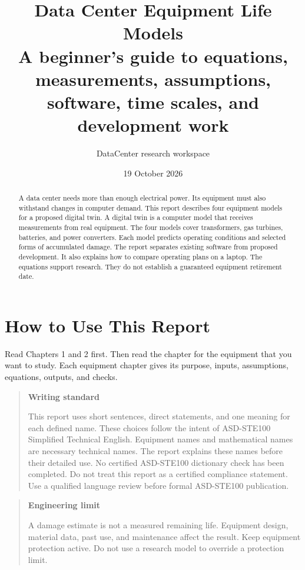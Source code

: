 \documentclass[11pt,a4paper]{report}
\title{Data Center Equipment Life Models\\[6pt]
\large A beginner's guide to equations, measurements, assumptions,\\
software, time scales, and development work}
\author{DataCenter research workspace}
\date{19 October 2026}
\newenvironment{warningbox}[1]{\begin{quote}\color{reportamber}\textbf{#1}\par\normalcolor}{\end{quote}}
\begin{document}
\hypersetup{pageanchor=false}
\maketitle
\begin{abstract}
A data center needs more than enough electrical power.
Its equipment must also withstand changes in computer demand.
This report describes four equipment models for a proposed digital twin.
A digital twin is a computer model that receives measurements from real equipment.
The four models cover transformers, gas turbines, batteries, and power converters.
Each model predicts operating conditions and selected forms of accumulated damage.
The report separates existing software from proposed development.
It also explains how to compare operating plans on a laptop.
The equations support research.
They do not establish a guaranteed equipment retirement date.
\end{abstract}
\hypersetup{pageanchor=true}

\chapter*{How to Use This Report}
Read Chapters 1 and 2 first.
Then read the chapter for the equipment that you want to study.
Each equipment chapter gives its purpose, inputs, assumptions, equations, outputs, and checks.

\begin{warningbox}{Writing standard}
This report uses short sentences, direct statements, and one meaning for each defined name.
These choices follow the intent of ASD-STE100 Simplified Technical English.
Equipment names and mathematical names are necessary technical names.
The report explains these names before their detailed use.
No certified ASD-STE100 dictionary check has been completed.
Do not treat this report as a certified compliance statement.
Use a qualified language review before formal ASD-STE100 publication.
\end{warningbox}

\begin{warningbox}{Engineering limit}
A damage estimate is not a measured remaining life.
Equipment design, material data, past use, and maintenance affect the result.
Keep equipment protection active.
Do not use a research model to override a protection limit.
\end{warningbox}
\end{document}

